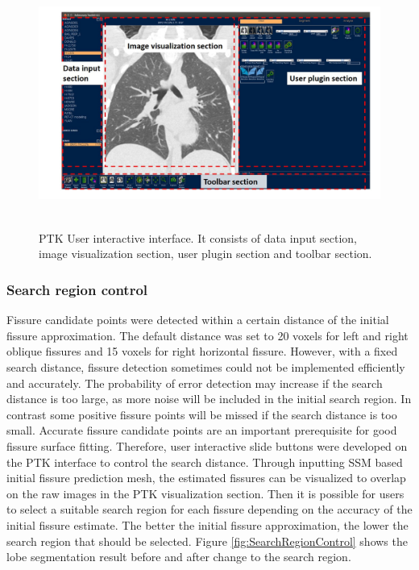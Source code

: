 {\begin{figure}[htbp]
  \flushleft 
  \includegraphics[height=3.2in]{Segmentation/Image/PTKUserInterface.jpg}
  \caption{PTK User interactive interface. It consists of data input section, image visualization section, user plugin section and toolbar section.}
  \label{fig:PTKUserInterface}
\end{figure}

\subsubsection{Search region control}
Fissure candidate points were detected within a certain distance of the initial fissure approximation. The default distance was set to 20 voxels for left and right oblique fissures and 15 voxels for right horizontal fissure. However, with a fixed search distance, fissure detection sometimes could not be implemented efficiently and accurately. The probability of error detection may increase if the search distance is too large, as more noise will be included in the initial search region. In contrast some positive fissure points will be missed if the search distance is too small. Accurate fissure candidate points are an important prerequisite for good fissure surface fitting. Therefore, user interactive slide buttons were developed on the PTK interface to control the search distance. Through inputting SSM based initial fissure prediction mesh, the estimated fissures can be  visualized to overlap on the raw images in the PTK visualization section. Then it is possible for users to select a suitable search region for each fissure depending on the accuracy of the initial fissure estimate. The better the initial fissure approximation, the lower the search region that should be selected. Figure \ref{fig:SearchRegionControl} shows the lobe segmentation result before and after change to the search region.

}

